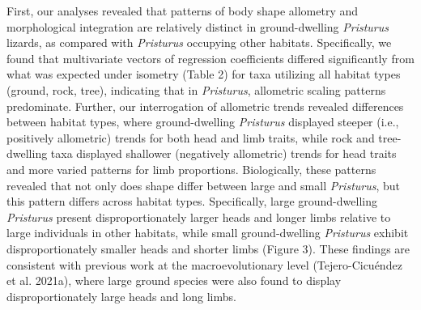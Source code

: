 \documentclass[
  11pt,
]{article}
\providecommand{\DIFaddtex}[1]{{\protect\color{blue}\uwave{#1}}} %
\providecommand{\DIFaddbegin}{} %
\providecommand{\DIFaddend}{} %
\providecommand{\DIFadd}[1]{\texorpdfstring{\DIFaddtex{#1}}{#1}} %
\newcommand{\DIFaddincludegraphics}[2][]{{\color{blue}\fbox{\DIFOincludegraphics[#1]{#2}}}} %
\DeclareRobustCommand{\DIFaddbegin}{\DIFOaddbegin \let\includegraphics\DIFaddincludegraphics} %
\DeclareRobustCommand{\DIFaddend}{\DIFOaddend \let\includegraphics\DIFOincludegraphics} %
\begin{document}
First, our analyses revealed that patterns of \DIFaddbegin \textbf{\DIFadd{CHANGE}}\DIFaddend body shape
allometry and morphological integration are relatively distinct in
ground-dwelling \emph{Pristurus} lizards, as compared with
\emph{Pristurus} occupying other habitats. Specifically, we found that
multivariate vectors of regression coefficients differed significantly
from what was expected under isometry (Table 2) for taxa utilizing all
habitat types (ground, rock, tree), indicating that in \emph{Pristurus},
allometric scaling patterns predominate. Further, our interrogation of
allometric trends revealed differences between habitat types, where
ground-dwelling \emph{Pristurus} displayed steeper (i.e., positively
allometric) trends for both head and limb traits, while rock and
tree-dwelling taxa displayed shallower (negatively allometric) trends
for head traits and more varied patterns for limb proportions.
Biologically, these patterns revealed that not only does shape differ
between large and small \emph{Pristurus}, but this pattern differs
across habitat types. Specifically, large ground-dwelling
\emph{Pristurus} present disproportionately larger heads and longer
limbs relative to large individuals in other habitats, while small
ground-dwelling \emph{Pristurus} exhibit disproportionately smaller
heads and shorter limbs (Figure 3). These findings are consistent with
previous work at the macroevolutionary level (Tejero-Cicuéndez et al.
2021a), where large ground species were also found to display
disproportionately large heads and long limbs. \hfill\break
\end{document}
